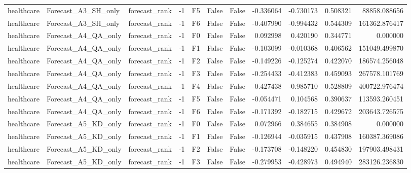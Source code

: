 \begin{tabular}{lllrlllrrrr}
healthcare &          Forecast\_A3\_SH\_only & forecast\_rank &    -1 &  F5 &           False &            False & -0.336064 & -0.730173 & 0.508321 &     88858.088656 \\
healthcare &          Forecast\_A3\_SH\_only & forecast\_rank &    -1 &  F6 &           False &            False & -0.407990 & -0.994432 & 0.544309 &    161362.876417 \\
healthcare &          Forecast\_A4\_QA\_only & forecast\_rank &    -1 &  F0 &           False &            False &  0.092998 &  0.420190 & 0.344771 &         0.000000 \\
healthcare &          Forecast\_A4\_QA\_only & forecast\_rank &    -1 &  F1 &           False &            False & -0.103099 & -0.010368 & 0.406562 &    151049.499870 \\
healthcare &          Forecast\_A4\_QA\_only & forecast\_rank &    -1 &  F2 &           False &            False & -0.149226 & -0.125274 & 0.422070 &    186574.256048 \\
healthcare &          Forecast\_A4\_QA\_only & forecast\_rank &    -1 &  F3 &           False &            False & -0.254433 & -0.412383 & 0.459093 &    267578.101769 \\
healthcare &          Forecast\_A4\_QA\_only & forecast\_rank &    -1 &  F4 &           False &            False & -0.427438 & -0.985710 & 0.528809 &    400722.976474 \\
healthcare &          Forecast\_A4\_QA\_only & forecast\_rank &    -1 &  F5 &           False &            False & -0.054471 &  0.104568 & 0.390637 &    113593.260451 \\
healthcare &          Forecast\_A4\_QA\_only & forecast\_rank &    -1 &  F6 &           False &            False & -0.171392 & -0.182715 & 0.429672 &    203643.726575 \\
healthcare &          Forecast\_A5\_KD\_only & forecast\_rank &    -1 &  F0 &           False &            False &  0.072966 &  0.384655 & 0.384908 &         0.000000 \\
healthcare &          Forecast\_A5\_KD\_only & forecast\_rank &    -1 &  F1 &           False &            False & -0.126944 & -0.035915 & 0.437908 &    160387.369086 \\
healthcare &          Forecast\_A5\_KD\_only & forecast\_rank &    -1 &  F2 &           False &            False & -0.173708 & -0.148220 & 0.454830 &    197903.498431 \\
healthcare &          Forecast\_A5\_KD\_only & forecast\_rank &    -1 &  F3 &           False &            False & -0.279953 & -0.428973 & 0.494940 &    283126.236830 \\

\end{tabular}
